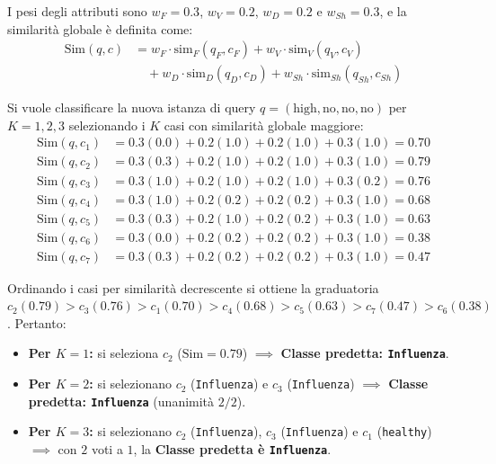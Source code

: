 I pesi degli attributi sono $w_F = 0.3$, $w_V = 0.2$, $w_D = 0.2$ e $w_{Sh} = 0.3$, e la similarit\`a globale \`e definita come:
\begin{equation}
\begin{split}
    \text{Sim}(q, c) &= w_F \cdot \text{sim}_F(q_F, c_F) + w_V \cdot \text{sim}_V(q_V, c_V) \\
    &\quad + w_D \cdot \text{sim}_D(q_D, c_D) + w_{Sh} \cdot \text{sim}_{Sh}(q_{Sh}, c_{Sh})
\end{split}
\end{equation}

Si vuole classificare la nuova istanza di query $q = (\text{high}, \text{no}, \text{no}, \text{no})$ per $K = 1, 2, 3$ selezionando i $K$ casi con similarit\`a globale maggiore:
\begin{align*}
    \text{Sim}(q, c_1) &= 0.3(0.0) + 0.2(1.0) + 0.2(1.0) + 0.3(1.0) = 0.70 \\
    \text{Sim}(q, c_2) &= 0.3(0.3) + 0.2(1.0) + 0.2(1.0) + 0.3(1.0) = 0.79 \\
    \text{Sim}(q, c_3) &= 0.3(1.0) + 0.2(1.0) + 0.2(1.0) + 0.3(0.2) = 0.76 \\
    \text{Sim}(q, c_4) &= 0.3(1.0) + 0.2(0.2) + 0.2(0.2) + 0.3(1.0) = 0.68 \\
    \text{Sim}(q, c_5) &= 0.3(0.3) + 0.2(1.0) + 0.2(0.2) + 0.3(1.0) = 0.63 \\
    \text{Sim}(q, c_6) &= 0.3(0.0) + 0.2(0.2) + 0.2(0.2) + 0.3(1.0) = 0.38 \\
    \text{Sim}(q, c_7) &= 0.3(0.3) + 0.2(0.2) + 0.2(0.2) + 0.3(1.0) = 0.47
\end{align*}

Ordinando i casi per similarit\`a decrescente si ottiene la graduatoria $c_2 (0.79) > c_3 (0.76) > c_1 (0.70) > c_4 (0.68) > c_5 (0.63) > c_7 (0.47) > c_6 (0.38)$. Pertanto:
\begin{itemize}
    \item \textbf{Per $K = 1$:} si seleziona $c_2$ ($\text{Sim} = 0.79$) $\implies$ \textbf{Classe predetta: \texttt{Influenza}}.
    \item \textbf{Per $K = 2$:} si selezionano $c_2$ (\texttt{Influenza}) e $c_3$ (\texttt{Influenza}) $\implies$ \textbf{Classe predetta: \texttt{Influenza}} (unanimit\`a $2/2$).
    \item \textbf{Per $K = 3$:} si selezionano $c_2$ (\texttt{Influenza}), $c_3$ (\texttt{Influenza}) e $c_1$ (\texttt{healthy}) $\implies$ con $2$ voti a $1$, la \textbf{Classe predetta \`e \texttt{Influenza}}.
\end{itemize}

\FloatBarrier
